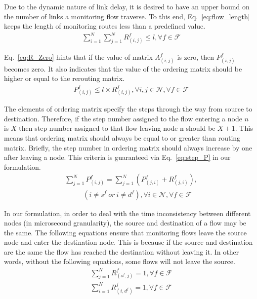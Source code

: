 \documentclass[10pt, journal, letterpaper]{IEEEtran}
\begin{document}
Due to the dynamic nature of link delay, it is desired to have an upper bound on the number of links a monitoring flow traverse. To this end, Eq.~\ref{eq:flow_length} keeps the length of monitoring routes less than a predefined value.
\begin{align} \label{eq:flow_length}
    & \sum_{i=1}^N{\sum_{j=1}^N{R_{(i,j)}^{f}}}\leq l,     \forall f\in \mathcal{F}
\end{align}

Eq.~\eqref{eq:R_Zero} hints that if the value of matrix $A_{(i,j)}^f$ is zero, then $P^f_{(i,j)}$ becomes zero. It also indicates that the value of the ordering matrix should be higher or equal to the rerouting matrix.
\begin{align} \label{eq:R_Zero}
    & P_{(i,j)}^{f}\leq l\times R^f_{(i,j)},     \forall i,j \in \mathcal{N}, \forall f\in \mathcal{F}
\end{align}

The elements of ordering matrix specify the steps through the way from source to destination. Therefore, if the step number assigned to the flow entering a node $n$ is $X$ then step number assigned to that flow leaving node n should be $X+1$. This means that ordering matrix should always be equal to or greater than routing matrix. Briefly, the step number in ordering matrix should always increase by one after leaving a node. This criteria is guaranteed via Eq.~\ref{eq:step_P} in our formulation.
\begin{align} \label{eq:step_P}
    & \sum_{j=1}^N{P_{(i,j)}^{f}} = \sum_{j=1}^N{\left(P_{(j,i)}^f+R_{(j,i)}^f\right)}, \\\nonumber
    &~~~~~~~~~~~~(i\neq s^f ~or~ i\neq d^f), \forall i\in \mathcal{N}, \forall f\in \mathcal{F}
\end{align}

In our formulation, in order to deal with the time inconsistency between different nodes (in microsecond granularity), the source and destination of a flow may be the same. The following equations ensure that monitoring flows leave the source node and enter the destination node. This is because if the source and destination are the same the flow has reached the destination without leaving it. In other words, without the following equations, some flows will not leave the source.
\begin{align}
    & \sum_{j=1}^N{R^f_{(s^f,j)}}=1, \forall f\in \mathcal{F}\\
    & \sum_{i=1}^N{R^f_{(i,d^f)}}=1, \forall f\in \mathcal{F}
\end{align}
\end{document}

